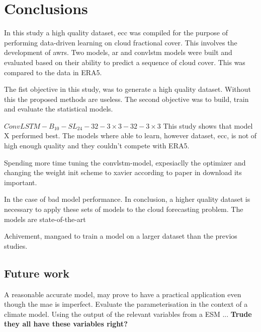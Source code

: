 \chapter{Conclusions}
In this study a high quality dataset, \acrfull{ecc} was compiled for the purpose of performing data-driven learning on cloud fractional cover. This involves the development of \acrfull{awrs}. %
Two models, \acrfull{ar} and \acrfull{convlstm} models were built and evaluated based on their ability to predict a sequence of cloud cover. This was compared to the data in ERA5. 

The fist objective in this study, was to generate a high quality dataset. Without this the proposed methods are useless. The second objective was to build, train and evaluate the statistical models. 

$ConvLSTM-B_{10}-SL_{24}-32-3\times3-32-3 \times3$ 
This study shows that model X performed best. The models where able to learn, however dataset, \acrshort{ecc}, is not of high enough quality and they couldn't compete with ERA5.

Spending more time tuning the \acrshort{convlstm}-model, expesiaclly the optimizer and changing the weight init scheme to xavier according to paper in download its important. 

In the case of bad model performance. In conclusion, a higher quality dataset is necessary to apply these sets of models to the cloud forecasting problem. The models are state-of-the-art 

Achivement, mangaed to train a model on a larger dataset than the previos studies.

\section{Future work}
A reasonable accurate model, may prove to have a practical application even though the \acrshort{mae} is imperfect. Evaluate the parameterisation in the context of a climate model. Using the output of the relevant variables from a \acrshort{ESM} ... \textbf{Trude they all have these variables right?}

